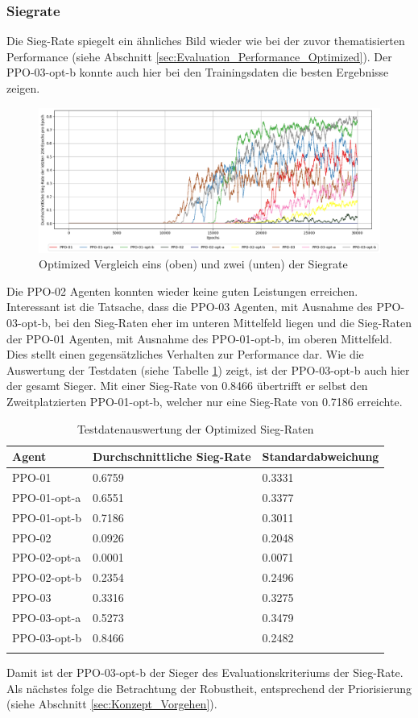 \subsubsection{Siegrate} \label{sec:Evaluation_Siegrate_Optimized}
Die Sieg-Rate spiegelt ein ähnliches Bild wieder wie bei der zuvor thematisierten Performance (siehe Abschnitt \ref{sec:Evaluation_Performance_Optimized}). Der PPO-03-opt-b konnte auch hier bei den Trainingsdaten die besten Ergebnisse zeigen. 
\begin{figure}[H]
	\centering
	\includegraphics[scale=0.4517]{Abbildungen/Evaluation/optimized-winrate.png}
	\caption[Optimized Vergleich Siegrate]{Optimized Vergleich eins (oben) und zwei (unten) der Siegrate}
	\label{fig:Optimized_Winrate}
\end{figure}
Die PPO-02 Agenten konnten wieder keine guten Leistungen erreichen. Interessant ist die Tatsache, dass die PPO-03 Agenten, mit Ausnahme des PPO-03-opt-b, bei den Sieg-Raten eher im unteren Mittelfeld liegen und die Sieg-Raten der PPO-01 Agenten, mit Ausnahme des PPO-01-opt-b, im oberen Mittelfeld. Dies stellt einen gegensätzliches Verhalten zur Performance dar.
Wie die Auswertung der Testdaten (siehe Tabelle \ref{tab:Evaluation_Testdaten_Winrate_Optimized}) zeigt, ist der PPO-03-opt-b auch hier der gesamt Sieger. Mit einer Sieg-Rate von 0.8466 übertrifft er selbst den Zweitplatzierten PPO-01-opt-b, welcher nur eine Sieg-Rate von 0.7186 erreichte.
\begin{longtable}[h]{|p{3.2cm}|p{6cm}|p{4cm}|}
	\hline
	Agent & Durchschnittliche Sieg-Rate & Standardabweichung \\
	\hline
	PPO-01 & 0.6759 & 0.3331 \\ 
	\hline
	PPO-01-opt-a & 0.6551 & 0.3377 \\ 
	\hline
	PPO-01-opt-b & 0.7186 & 0.3011 \\ 
	\hline
	PPO-02 & 0.0926 & 0.2048 \\ 
	\hline
	PPO-02-opt-a & 0.0001 & 0.0071 \\ 
	\hline
	PPO-02-opt-b & 0.2354 & 0.2496 \\ 
	\hline
	PPO-03 & 0.3316 & 0.3275 \\ 
	\hline
	PPO-03-opt-a & 0.5273 & 0.3479 \\ 
	\hline
	PPO-03-opt-b & 0.8466 & 0.2482 \\ 
	\hline
	\caption{Testdatenauswertung der Optimized Sieg-Raten}
	\label{tab:Evaluation_Testdaten_Winrate_Optimized} 
\end{longtable}
Damit ist der PPO-03-opt-b der Sieger des Evaluationskriteriums der Sieg-Rate. Als nächstes folge die Betrachtung der Robustheit, entsprechend der Priorisierung (siehe Abschnitt \ref{sec:Konzept_Vorgehen}).

